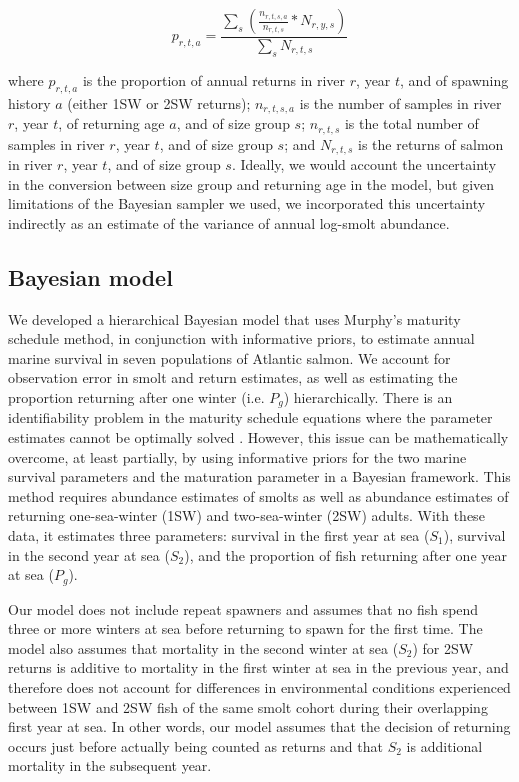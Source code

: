 \documentclass[12pt]{article}
\newcommand{\So}{$S_{1}$\xspace}
\newcommand{\St}{$S_{2}$\xspace}
\newcommand{\Pg}{$P_g$\xspace}
\begin{document}
\begin{equation}
    p_{r,t,a} = \frac{\sum_{s}{(\frac{n_{r,t,s,a}}{n_{r,t,s}} * N_{r,y,s})}}{\sum_{s}{N_{r,t,s}}}
\end{equation}

where $p_{r,t,a}$ is the proportion of annual returns in river $r$, year $t$,
and of spawning history $a$ (either 1SW or 2SW returns); $n_{r,t,s,a}$ is the
number of samples in river $r$, year $t$, of returning age $a$, and of size
group $s$; $n_{r,t,s}$ is the total number of samples in river $r$, year $t$,
and of size group $s$; and $N_{r,t,s}$ is the returns of salmon
in river $r$, year $t$, and of size group $s$.
Ideally, we would account the uncertainty in the conversion between
size group and returning age in the model, but given limitations of the Bayesian 
sampler we used, we incorporated this uncertainty indirectly as an estimate
of the variance of annual log-smolt abundance.

\subsection*{Bayesian model}

We developed a hierarchical Bayesian model that uses Murphy's maturity
schedule method, in conjunction with informative priors, to estimate annual
marine survival in seven populations of Atlantic salmon. We account for
observation error in smolt and return estimates, as well as estimating the
proportion returning after one winter (i.e. \Pg) hierarchically.
There is an identifiability problem in the maturity schedule equations where
the parameter estimates cannot be optimally solved \citep{Chaput2003a}.
However, this issue can be mathematically overcome, at least partially, by
using informative priors for the two marine survival parameters and the maturation
parameter in a Bayesian framework.
This method requires abundance estimates of smolts as well as abundance estimates
of returning one-sea-winter (1SW) and two-sea-winter (2SW) adults. With these data,
it estimates three parameters: survival in the first year at sea (\So), survival
in the second year at sea (\St), and the proportion of fish returning after one
year at sea (\Pg). 

Our model does not include repeat spawners and assumes that no fish spend
three or more winters at sea before returning to spawn for the first time.
The model also assumes that mortality in the second winter at sea (\St) for 2SW returns
is additive to mortality in the first winter at sea in the previous year, 
and therefore does not account for differences in environmental conditions experienced
between 1SW and 2SW fish of the same smolt cohort during their overlapping first year at sea.
In other words, our model assumes that the decision of returning occurs just before
actually being counted as returns and that \St is additional mortality in
the subsequent year. 
\end{document}
